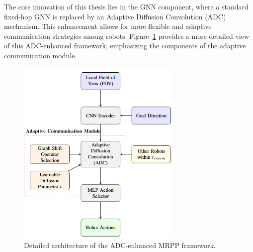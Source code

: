 The core innovation of this thesis lies in the GNN component, where a standard fixed-hop GNN is replaced by an Adaptive Diffusion Convolution (ADC) mechanism. This enhancement allows for more flexible and adaptive communication strategies among robots. Figure~\ref{fig:adc_enhanced_architecture_detail} provides a more detailed view of this ADC-enhanced framework, emphasizing the components of the adaptive communication module.
\begin{figure}
    \centering
    \includegraphics[width=0.7\textwidth]{images/block_diagram.png} %
    \caption{Detailed architecture of the ADC-enhanced MRPP framework.}
\label{fig:adc_enhanced_architecture_detail}
\end{figure}
